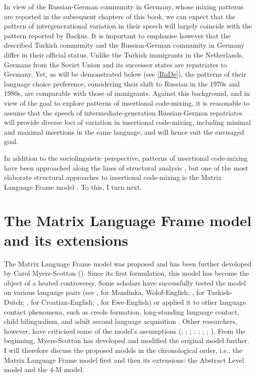 In view of the Russian-German community in Germany, whose mixing patterns are reported in the subsequent chapters of this book, we can expect that the pattern of intergenerational variation in their speech will largely coincide with the pattern reported by Backus. It is important to emphasise however that the described Turkish community and the Russian-German community in Germany differ in their official status. Unlike the Turkish immigrants in the Netherlands, Germans from the Soviet Union and its successor states are repatriates to Germany. Yet, as will be demonstrated below (see \ref{RuDe}), the patterns of their language choice preference, considering their shift to Russian in the 1970s and 1980s, are comparable with those of immigrants. Against this background, and in view of the goal to explore patterns of insertional code-mixing, it is reasonable to assume that the speech of intermediate-generation Russian-German repatriates will provide diverse loci of variation in insertional code-mixing, including minimal and maximal insertions in the same language, and will hence suit the envisaged goal.

In addition to the sociolinguistic perspective, patterns of insertional code-mixing have been approached along the lines of structural analysis \citep[e.g.,][]{halmari-government-1997,boumans-syntax-1998,verschik08}, but one of the most elaborate structural approaches to insertional code-mixing is the Matrix Language Frame model \citep[cf.][363]{muysken-code-switching-1997}. To this, I turn next.

\section{The Matrix Language Frame model and its extensions}{\label{MLF}}
The Matrix Language Frame model was proposed and has been further developed by Carol Myers-Scotton  (\citeyear{myers-scotton-duelling-1993,myers-scotton-contact-2002}). Since its first formulation, this model has become the object of a heated controversy. Some scholars have successfully tested the model on various language pairs (see \citealt[]{haust-codeswitching-1995}, for Mandinka, Wolof-English;  \citealt[]{backus-two-1996}, for Turkish-Dutch;  \citealt[]{hlavac-second-generation-2003}, for Croatian-English;
\citealt[][]{amuzu-composite-2010}, for Ewe-English) or applied it to other language contact phenomena, such as creole formation, long-standing language contact, child bilingualism, and adult second language acquisition \citep[cf.][]{myers-scotton-testing-2000}. Other researchers, however, have criticised some of the model's assumptions (\citealt{meechan-orphan-1995}; \citealt{halmari-government-1997};   \citealt{jacobson-codeswitching-1998};  \citealt{boumans-syntax-1998}; \citealt{auer-embedded-2005};  \citealt{muhamedowa-untersuchung-2006};  \citealt{bullock-toribio-chang};  \citealt{zabrodskaja-evaluating-2009}). From the beginning, Myers-Scotton has developed and modified the original model further. I will therefore discuss the proposed models in the chronological order, i.e., the Matrix Language Frame model first and then its extensions: the Abstract Level model and the 4-M model.


